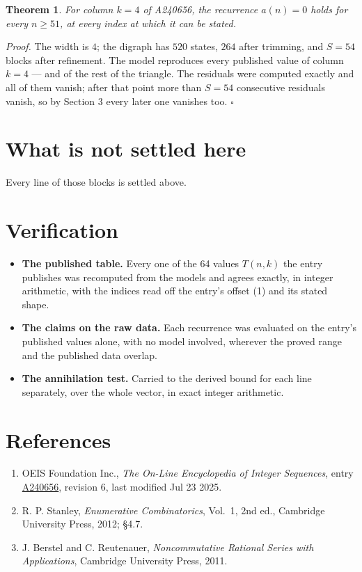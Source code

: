 \documentclass[11pt]{article}
\newtheorem{theorem}{Theorem}
\theoremstyle{definition}
\begin{document}
\begin{theorem} For column $k = 4$ of A240656, the recurrence $a(n) = 0$ holds for every $n \ge 51$, at every index at which it can be stated.\end{theorem}

{\itshape Proof.} The width is $4$; the digraph has $520$ states, $264$ after trimming, and $S = 54$ blocks after refinement. The model reproduces every published value of column $k = 4$ --- and of the rest of the triangle. The residuals were computed exactly and all of them vanish; after that point more than $S = 54$ consecutive residuals vanish, so by Section 3 every later one vanishes too. $\square$

\section{What is not settled here}

Every line of those blocks is settled above.

\section{Verification}

\begin{itemize}

\item {\bfseries The published table.} Every one of the 64 values $T(n,k)$ the entry publishes was recomputed from the models and agrees exactly, in integer arithmetic, with the indices read off the entry's offset (1) and its stated shape.

\item {\bfseries The claims on the raw data.} Each recurrence was evaluated on the entry's published values alone, with no model involved, wherever the proved range and the published data overlap.

\item {\bfseries The annihilation test.} Carried to the derived bound for each line separately, over the whole vector, in exact integer arithmetic.

\end{itemize}

\section{References}

\begin{enumerate}

\item OEIS Foundation Inc., \emph{The On-Line Encyclopedia of Integer Sequences}, entry \href{https://oeis.org/A240656}{A240656}, revision 6, last modified Jul 23 2025.

\item R. P. Stanley, \emph{Enumerative Combinatorics}, Vol.~1, 2nd ed., Cambridge University Press, 2012; \S4.7.

\item J. Berstel and C. Reutenauer, \emph{Noncommutative Rational Series with Applications}, Cambridge University Press, 2011.

\end{enumerate}
\end{document}
